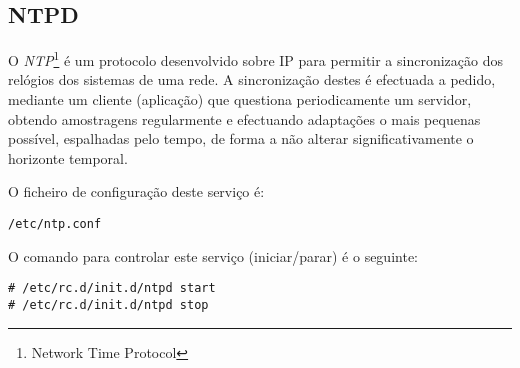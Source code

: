 \subsection{NTPD}

O \emph{NTP}\footnote{Network Time Protocol} é um protocolo desenvolvido sobre IP para permitir a sincronização dos relógios dos sistemas de uma rede. A sincronização destes é efectuada a pedido, mediante um cliente (aplicação) que questiona periodicamente um servidor, obtendo amostragens regularmente e efectuando adaptações o mais pequenas possível, espalhadas pelo tempo, de forma a não alterar significativamente o horizonte temporal.

O ficheiro de configuração deste serviço é:

\begin{Verbatim}[commandchars=\\\{\}]
/etc/ntp.conf
\end{Verbatim}

O comando para controlar este serviço (iniciar/parar) é o seguinte:

\begin{Verbatim}[commandchars=\\\{\}]
# /etc/rc.d/init.d/ntpd start
# /etc/rc.d/init.d/ntpd stop
\end{Verbatim}


